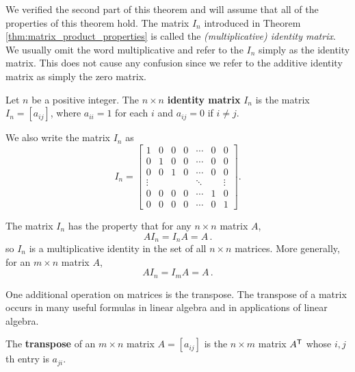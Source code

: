 We verified the second part of this theorem and will assume that all of the properties of this theorem hold. The matrix $I_n$ introduced in Theorem \ref{thm:matrix_product_properties} is called the \emph{(multiplicative) identity matrix}. We usually omit the word multiplicative and refer to the $I_n$ simply as the identity matrix. This does not cause any confusion since we refer to the additive identity matrix as simply the zero matrix.


 
\begin{definition} Let $n$ be a positive integer. The $n \times n$ \textbf{identity matrix} $I_n$ is the matrix $I_n = [a_{ij}]$, where $a_{ii} = 1$ for each $i$ and $a_{ij} = 0$ if $i \neq j$.
\end{definition}



We also write the matrix $I_n$ as
\[I_n = \left[ \begin{array}{ccccccc} 1 & 0 & 0 & 0 & \cdots & 0 & 0 \\ 0 & 1 & 0 & 0 & \cdots & 0 & 0 \\ 0 & 0 & 1 & 0 & \cdots & 0 & 0 \\ \vdots & & & & \ddots & & \vdots \\ 0 & 0 & 0 & 0 & \cdots & 1 & 0 \\ 0 & 0& 0 & 0 & \cdots & 0 & 1 \end{array} \right].\]

The matrix $I_n$ has the property that for any $n \times n$ matrix $A$,
\[AI_n = I_n A = A\,.\]
so $I_n$ is a multiplicative identity in the set of all $n \times n$ matrices. More generally, for an $m\times n$ matrix $A$,
\[ AI_n = I_mA = A \,.\]


One additional operation on matrices is the transpose. The transpose of a matrix occurs in many useful formulas in linear algebra and in applications of linear algebra. 



\begin{definition} The \textbf{transpose} of an $m \times n$ matrix $A = [a_{ij}]$ is the $n \times m$ matrix
$A^{\mathsf{T}}$ whose $i,j$th entry is $a_{ji}$. 
\end{definition}



